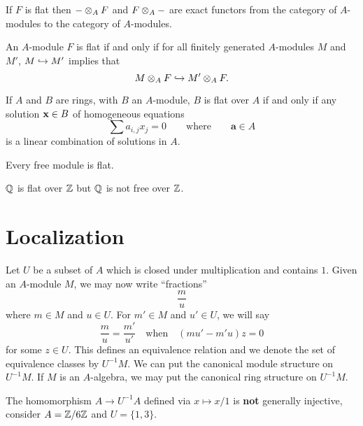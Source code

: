 \documentclass{ximera}
\begin{document}
\begin{remark} If $F$ is flat then $-\otimes_A F$ and $F\otimes_A -$ are exact functors from the category of $A$-modules to the category of $A$-modules.
\end{remark}

\begin{proposition} An $A$-module $F$ is flat if and only if for all finitely generated $A$-modules $M$ and $M'$, $M\hookrightarrow M'$ implies that 
\[
M\otimes_A F \hookrightarrow M'\otimes_A F.
\]
\end{proposition}

\begin{proposition}
  If $A$ and $B$ are rings, with $B$ an $A$-module, $B$ is flat over
  $A$ if and only if any solution $\mathbf{x}\in B$ of homogeneous equations
  \[
  \sum a_{i,j} x_j =0 \qquad\text{where}\qquad \mathbf{a}\in A
  \]
  is a linear combination of solutions in $A$.
\end{proposition}


\begin{proposition} Every free module is flat.
\end{proposition}

\begin{example} $\mathbb Q$ is flat over $\mathbb Z$ but $\mathbb Q$ is not free over $\mathbb Z$.
\end{example}





\section{Localization}

Let $U$ be a subset of $A$ which is closed under multiplication and contains $1$. Given an $A$-module $M$, we may now write ``fractions'' 
\[
\frac{m}{u}
\]
where $m\in M$ and $u\in U$. For $m'\in M$ and $u'\in U$, we will say
\[
\frac{m}{u} = \frac{m'}{u'}\quad\text{when}\quad (mu' -m'u)z = 0 
\]
for some $z\in U$. This defines an equivalence relation and we denote the set of equivalence classes by $U^{-1} M$. We can put the canonical module structure on $U^{-1}M$. If $M$ is an $A$-algebra, we may put the canonical ring structure on $U^{-1}M$.


\begin{warning} The homomorphism $A\to U^{-1}A$ defined via $x\mapsto x/1$ is \textbf{not} generally injective, consider $A = \mathbb Z/6\mathbb Z$ and $U = \{1,3\}$.
\end{warning}
\end{document}
